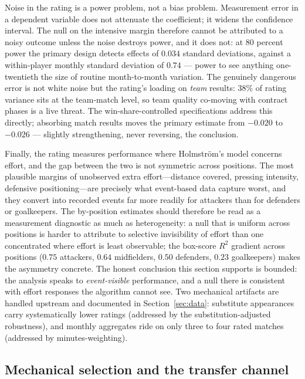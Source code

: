 \documentclass{article}
\begin{document}
Noise in the rating is a power problem, not a bias problem. Measurement
error in a dependent variable does not attenuate the coefficient; it widens
the confidence interval. The null on the intensive margin therefore cannot
be attributed to a noisy outcome unless the noise destroys power, and it
does not: at 80 percent power the primary design detects effects of $0.034$
standard deviations, against a within-player monthly standard deviation of
$0.74$ --- power to see anything one-twentieth the size of routine
month-to-month variation. The genuinely dangerous error is not white noise but
the rating's loading on \emph{team} results: $38\%$ of rating variance
sits at the team-match level, so team quality co-moving with contract phases
is a live threat. The win-share-controlled specifications address this
directly; absorbing match results moves the primary estimate from $-0.020$
to $-0.026$ --- slightly strengthening, never reversing, the conclusion.

Finally, the rating measures performance where Holmstr{\"o}m's model concerns
effort, and the gap between the two is not symmetric across positions. The
most plausible margins of unobserved extra effort---distance covered,
pressing intensity, defensive positioning---are precisely what event-based
data capture worst, and they convert into recorded events far more readily
for attackers than for defenders or goalkeepers. The by-position estimates
should therefore be read as a measurement diagnostic as much as
heterogeneity: a null that is uniform across positions is harder to attribute
to selective invisibility of effort than one concentrated where effort is
least observable; the box-score $R^2$ gradient across positions ($0.75$
attackers, $0.64$ midfielders, $0.50$ defenders, $0.23$ goalkeepers) makes
the asymmetry concrete.
The honest conclusion this section supports is bounded: the analysis speaks
to \emph{event-visible} performance, and a null there is consistent with
effort responses the algorithm cannot see. Two mechanical artifacts are
handled upstream and documented in Section~\ref{sec:data}: substitute
appearances carry systematically lower ratings (addressed by the
substitution-adjusted robustness), and monthly aggregates ride on only three
to four rated matches (addressed by minutes-weighting).


\subsection{Mechanical selection and the transfer channel}
\end{document}

